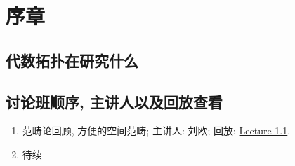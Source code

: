 \chapter*{序章}
\section{代数拓扑在研究什么}
\section{讨论班顺序, 主讲人以及回放查看}
\begin{enumerate}
    \item 范畴论回顾, 方便的空间范畴; 主讲人: 刘欧; 回放: \href{https://www.bilibili.com/video/BV1thxEeRE6h/}{Lecture 1.1}.
    \item 待续
\end{enumerate}
